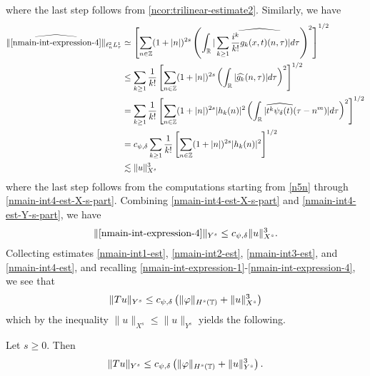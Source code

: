 %
where the last step follows from \cref{ncor:trilinear-estimate2}. Similarly,
we have
%
%
\begin{equation}
\label{nmain-int4-est-Y-s-part}
	\begin{split}
    \|\widehat{\eqref{nmain-int-expression-4}}\|_{ \ell^2_n L^1_\tau }
		& \simeq \left[ \sum_{n \in
		\mathbb{Z}}(1 + | n |)^{2s} \left( \int_{\mathbb{R}} | \sum_{k \ge 1}
		\widehat{\frac{i^{k}}{k!}g_{k}(x,t)(n, \tau)} |d \tau \right)^{2} \right]^{1/2}
		\\
		& \le \sum_{k \ge 1} \frac{1}{k!} \left[ \sum_{n \in \mathbb{Z}} (1 + | n
    |)^{2s} \left( \int_{\mathbb{R}} | \widehat{g_{k}}(n, \tau) | d \tau \right)^{2}
		\right]^{1/2}
		\\
		& = \sum_{k \ge 1} \frac{1}{k!} \left[ \sum_{n \in \mathbb{Z}} (1 + | n
		|)^{2s} | h_{k}(n) |^2 \left( \int_{\mathbb{R}} | \widehat{t^{k} \psi_{\delta}(t)}(\tau -
		n^{m}) |d \tau \right)^{2} \right]^{1/2}
		\\
		& = c_{\psi, \delta} \sum_{k \ge 1} \frac{1}{k!} \left[ \sum_{n \in \mathbb{Z}} (1 + | n
		|)^{2s} | h_{k}(n) |^2 \right]^{1/2}
		\\
		& \lesssim \|u\|_{X^s}^{3}
	\end{split}
\end{equation}
%
%
where the last step follows from the computations starting from \eqref{n5n}
through \eqref{nmain-int4-est-X-s-part}.
Combining \eqref{nmain-int4-est-X-s-part} and \eqref{nmain-int4-est-Y-s-part}, we
have
%
%
\begin{equation}
\label{nmain-int4-est}
	\begin{split}
    \|\eqref{nmain-int-expression-4}\|_{Y^s} \le c_{\psi, \delta} \|u\|_{X^s}^{3}.
	\end{split}
\end{equation}
%
%
Collecting estimates \eqref{nmain-int1-est}, \eqref{nmain-int2-est}, 
\eqref{nmain-int3-est}, and \eqref{nmain-int4-est}, and recalling 
\eqref{nmain-int-expression-1}-\eqref{nmain-int-expression-4}, we see that
$$\|Tu\|_{Y^s} \le c_{\psi,\delta} \left( \|\varphi \|_{H^s(\mathbb{T})} + \|u\|_{X^s}^3 \right )$$ 
which by the inequality $\|u\|_{X^s} \le \|u\|_{Y^s}$ yields the following.
%
%				 
%
\begin{proposition}
\label{nprop:contraction}
	Let $s \ge0$. Then
%
\begin{equation*}
	\begin{split}
		\|Tu\|_{Y^s} \le c_{\psi,\delta} \left( \|\varphi \|_{H^s(\mathbb{T})} + \|u\|_{Y^s}^3 
		\right).
	\end{split}
\end{equation*}
%
\end{proposition}
